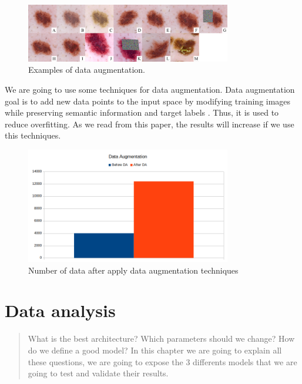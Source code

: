 \begin{figure}[H]
\centering
\includegraphics[width=0.8\textwidth]{./figures/data-augmentation}
\caption{Examples of data augmentation. \cite{data-augmentation-skin}}
\end{figure}

We are going to use some techniques for data augmentation. Data augmentation goal is to add new data
points to the input space by modifying training images while preserving semantic 
information and target labels \cite{data-augmentation-skin}. Thus, it is used to reduce overfitting. As we read from this paper, the results will increase if we use this techniques.


\begin{figure}[H]
\centering
\includegraphics[width=0.8\textwidth]{./figures/data-augmentation-plot}
\caption{Number of data after apply data augmentation techniques}
\end{figure}

\chapter{Data analysis}

\begin{abstract}
What is the best architecture? Which parameters should we change? How do we define a good model? In this chapter we are going to explain all these questions, we are going to expose the 3 differents models that we are going to test and validate their results.

\end{abstract}

